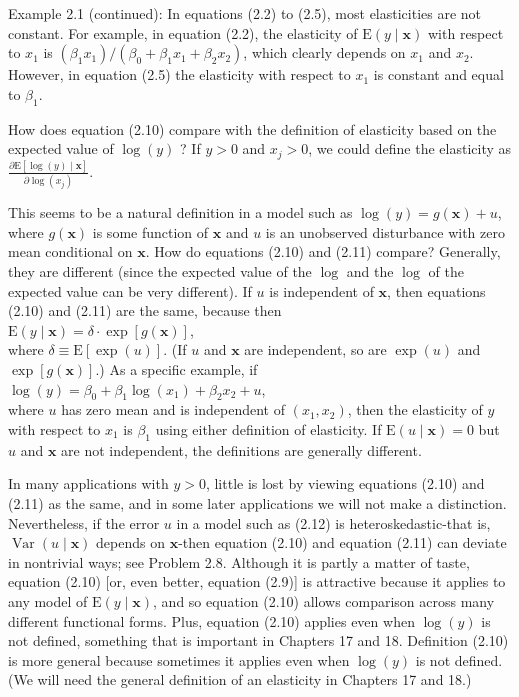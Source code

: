 \documentclass[10pt]{article}
\begin{document}
Example 2.1 (continued): In equations (2.2) to (2.5), most elasticities are not constant. For example, in equation (2.2), the elasticity of $\mathrm{E}(y \mid \mathbf{x})$ with respect to $x_{1}$ is $\left(\beta_{1} x_{1}\right) /\left(\beta_{0}+\beta_{1} x_{1}+\beta_{2} x_{2}\right)$, which clearly depends on $x_{1}$ and $x_{2}$. However, in equation (2.5) the elasticity with respect to $x_{1}$ is constant and equal to $\beta_{1}$.

How does equation (2.10) compare with the definition of elasticity based on the expected value of $\log (y)$ ? If $y>0$ and $x_{j}>0$, we could define the elasticity as\\
$\frac{\partial \mathrm{E}[\log (y) \mid \mathbf{x}]}{\partial \log \left(x_{j}\right)}$.

This seems to be a natural definition in a model such as $\log (y)=g(\mathbf{x})+u$, where $g(\mathbf{x})$ is some function of $\mathbf{x}$ and $u$ is an unobserved disturbance with zero mean conditional on $\mathbf{x}$. How do equations (2.10) and (2.11) compare? Generally, they are different (since the expected value of the $\log$ and the $\log$ of the expected value can be very different). If $u$ is independent of $\mathbf{x}$, then equations (2.10) and (2.11) are the same, because then\\
$\mathrm{E}(y \mid \mathbf{x})=\delta \cdot \exp [g(\mathbf{x})]$,\\
where $\delta \equiv \mathrm{E}[\exp (u)]$. (If $u$ and $\mathbf{x}$ are independent, so are $\exp (u)$ and $\exp [g(\mathbf{x})]$.) As a specific example, if\\
$\log (y)=\beta_{0}+\beta_{1} \log \left(x_{1}\right)+\beta_{2} x_{2}+u$,\\
where $u$ has zero mean and is independent of $\left(x_{1}, x_{2}\right)$, then the elasticity of $y$ with respect to $x_{1}$ is $\beta_{1}$ using either definition of elasticity. If $\mathrm{E}(u \mid \mathbf{x})=0$ but $u$ and $\mathbf{x}$ are not independent, the definitions are generally different.

In many applications with $y>0$, little is lost by viewing equations (2.10) and (2.11) as the same, and in some later applications we will not make a distinction. Nevertheless, if the error $u$ in a model such as (2.12) is heteroskedastic-that is, $\operatorname{Var}(u \mid \mathbf{x})$ depends on $\mathbf{x}$-then equation (2.10) and equation (2.11) can deviate in nontrivial ways; see Problem 2.8. Although it is partly a matter of taste, equation (2.10) [or, even better, equation (2.9)] is attractive because it applies to any model of $\mathrm{E}(y \mid \mathbf{x})$, and so equation (2.10) allows comparison across many different functional forms. Plus, equation (2.10) applies even when $\log (y)$ is not defined, something that is important in Chapters 17 and 18. Definition (2.10) is more general because sometimes it applies even when $\log (y)$ is not defined. (We will need the general definition of an elasticity in Chapters 17 and 18.)
\end{document}

